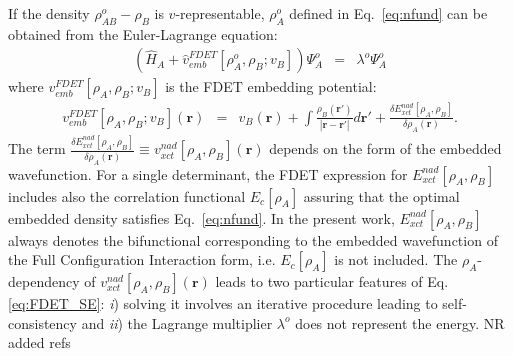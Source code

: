 \documentclass[amsmath,amssymb,preprint,aip,jcp]{revtex4-1}
\newcommand{\nr}[1]{\color{red}#1\color{black}}
\begin{document}
If the density $\rho^{o}_{AB}-\rho_{B}$ is $v$-representable,  $\rho_A^{o}$ defined in Eq.~\ref{eq:nfund} can be obtained from the Euler-Lagrange equation:
\begin{eqnarray}
    \left( \hat{H}_A + \hat{v}_{emb}^{{FDET}}[\rho_A^{{o}}, \rho_B; v_B] \right) \Psi_A^{{o}} &=& \lambda^{o}\Psi_A^{{o}} \label{eq:FDET_SE} 
\end{eqnarray}
where $v_{emb}^{{FDET}}[\rho_A,\rho_B; v_B]$
is the FDET embedding potential:
\begin{eqnarray}
v_{emb}^{{FDET}}[\rho_A,\rho_B; v_B](\mathbf{r}) &=& v_B(\mathbf{r}) +  \int \frac{\rho_B(\mathbf{r}')}{|\mathbf{r}-\mathbf{r}'|} d\mathbf{r}'+ \frac{\delta E_{xct}^{nad}[\rho_A,\rho_B]}{\delta\rho_A(\mathbf{r})}.
\label{eq:nFDET_embpot}  
\end{eqnarray}
The term $\frac{\delta E_{xct}^{nad}[\rho_A,\rho_B]}{\delta\rho_A(\mathbf{r})}\equiv v_{xct}^{nad}[\rho_A,\rho_B](\mathbf{r})$ depends on the form of the embedded wavefunction\cite{Wesolowski2008}.
For a single determinant, the FDET expression for $E_{xct}^{nad}[\rho_A,\rho_B]$   includes also the correlation functional $E_c[\rho_A]$  assuring that the optimal embedded density satisfies Eq.~\ref{eq:nfund}. 
In the present work,  $E_{xct}^{nad}[\rho_A,\rho_B]$ \nr{always } denotes the \nr{bi}functional corresponding to the embedded wavefunction of the Full Configuration Interaction form\cite{Wesolowski2008}, i.e. \nr{$E_c[\rho_A]$ is not included}.
The $\rho_A$-dependency of  $v_{xct}^{nad}[\rho_A,\rho_B](\mathbf{r})$ leads to two 
particular features of Eq. \ref {eq:FDET_SE}: {\it i}) solving it involves an iterative procedure leading to self-consistency\cite{Dulak2009} and {\it ii}) the Lagrange multiplier $\lambda^{o}$  does not represent the energy.\cite{Zech2016}  \nr{NR added refs }
\end{document}
